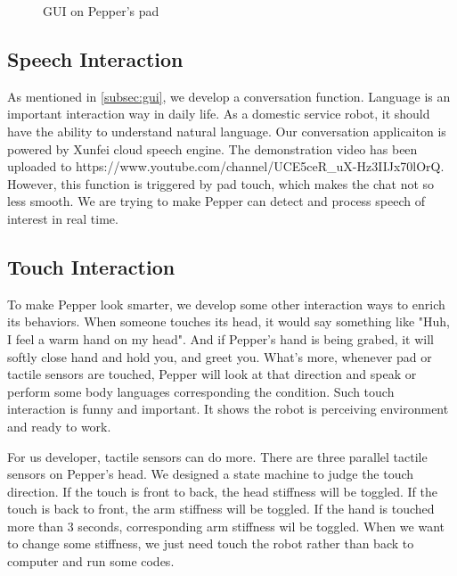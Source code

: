 \begin{figure}[!h]
    \caption{GUI on Pepper's pad}
    
    \label{figb} %
    
    \end{figure}

\subsection{Speech Interaction}
\label{subsec:speech}
As mentioned in \ref{subsec:gui}, we develop a conversation function. 
Language is an important interaction way in daily life.
As a domestic service robot, it should have the ability to understand natural language.
Our conversation applicaiton is powered by Xunfei cloud speech engine.
The demonstration video has been uploaded to https://www.youtube.com/channel/UCE5ceR\_uX-Hz3IIJx70lOrQ.
However, this function is triggered by pad touch, which makes the chat not so less smooth.
We are trying to make Pepper can detect and process speech of interest in real time.

\subsection{Touch Interaction}
\label{subsec:otherinteraction}
To make Pepper look smarter, we develop some other interaction ways to enrich its behaviors.
When someone touches its head, it would say something like "Huh, I feel a warm hand on my head".
And if Pepper's hand is being grabed, it will softly close hand and hold you, and greet you.
What's more, whenever pad or tactile sensors are touched, Pepper will look at that direction and speak or perform some body languages corresponding the condition.
Such touch interaction is funny and important.
It shows the robot is perceiving environment and ready to work.

For us developer, tactile sensors can do more.
There are three parallel tactile sensors on Pepper's head.
We designed a state machine to judge the touch direction.
If the touch is front to back, the head stiffness will be toggled.
If the touch is back to front, the arm stiffness will be toggled.
If the hand is touched more than 3 seconds, corresponding arm stiffness wil be toggled.
When we want to change some stiffness, we just need touch the robot rather than back to computer and run some codes.